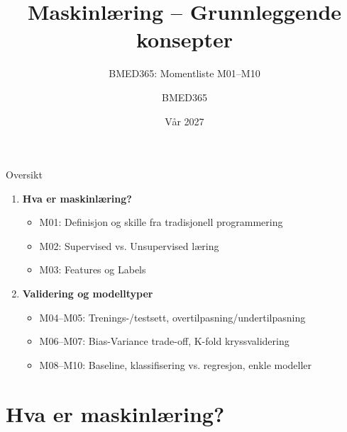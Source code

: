 \documentclass[aspectratio=169, 10pt]{beamer}
\title{Maskinlæring -- Grunnleggende konsepter}
\subtitle{BMED365: Momentliste M01--M10}
\author{BMED365}
\date{Vår 2027}
\begin{document}
\begin{frame}
    \titlepage
\end{frame}

\begin{frame}{Oversikt}
    \begin{enumerate}
        \item \textbf{Hva er maskinlæring?}
        \begin{itemize}
            \item M01: Definisjon og skille fra tradisjonell programmering
            \item M02: Supervised vs. Unsupervised læring
            \item M03: Features og Labels
        \end{itemize}
        \item \textbf{Validering og modelltyper}
        \begin{itemize}
            \item M04--M05: Trenings-/testsett, overtilpasning/undertilpasning
            \item M06--M07: Bias-Variance trade-off, K-fold kryssvalidering
            \item M08--M10: Baseline, klassifisering vs. regresjon, enkle modeller
        \end{itemize}
    \end{enumerate}
\end{frame}

\section{Hva er maskinlæring?}
\end{document}
